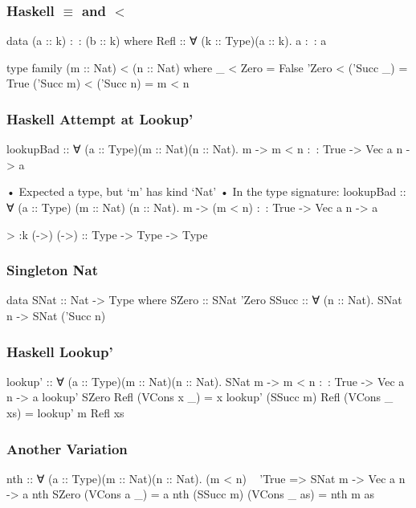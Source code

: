 \documentclass{beamer}
\begin{document}
\begin{frame}[fragile]\frametitle{Haskell $\equiv$ and $<$}
\begin{semiverbatim}
data (a :: k) :~: (b :: k) where
  Refl :: ∀ (k :: Type)(a :: k). a :~: a

type family (m :: Nat) < (n :: Nat) where
  _         < Zero      = False
  'Zero     < ('Succ _) = True
  ('Succ m) < ('Succ n) = m < n
\end{semiverbatim}
\end{frame}

\begin{frame}[fragile]\frametitle{Haskell Attempt at Lookup'}
\begin{semiverbatim}
lookupBad :: ∀ (a :: Type)(m :: Nat)(n :: Nat).
             m -> m < n :~: True -> Vec a n -> a

  • Expected a type, but ‘m’ has kind ‘Nat’
  • In the type signature:
      lookupBad :: ∀ (a :: Type) (m :: Nat) (n :: Nat).
                   m -> (m < n) :~: True -> Vec a n -> a

> :k (->)
(->) :: Type -> Type -> Type
\end{semiverbatim}
\end{frame}

\begin{frame}[fragile]\frametitle{Singleton Nat}
\begin{semiverbatim}
data SNat :: Nat -> Type where
  SZero :: SNat 'Zero
  SSucc :: ∀ (n :: Nat). SNat n -> SNat ('Succ n)
\end{semiverbatim}
\end{frame}

\begin{frame}[fragile]\frametitle{Haskell Lookup'}
\begin{semiverbatim}
lookup' :: ∀ (a :: Type)(m :: Nat)(n :: Nat).
           SNat m -> m < n :~: True -> Vec a n -> a
lookup' SZero     Refl (VCons x _)  = x
lookup' (SSucc m) Refl (VCons _ xs) = lookup' m Refl xs
\end{semiverbatim}
\end{frame}

\begin{frame}[fragile]\frametitle{Another Variation}
\begin{semiverbatim}
nth :: ∀ (a :: Type)(m :: Nat)(n :: Nat).
       (m < n) ~ 'True => SNat m -> Vec a n -> a
nth SZero     (VCons a _)  = a
nth (SSucc m) (VCons _ as) = nth m as
\end{semiverbatim}
\end{frame}
\end{document}
